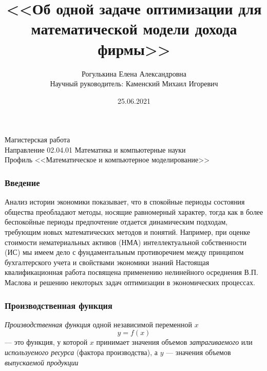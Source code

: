 \documentclass[10pt, pdf, hyperref={unicode}]{beamer}
\title{<<Об одной задаче оптимизации для математической модели дохода фирмы>>}
\date{25.06.2021}
\author{Рогулькина Елена Александровна\\
    \vspace{0.7cm}
    Научный руководитель: Каменский Михаил Игоревич\\
    \vspace{0.7cm}
}
\begin{document}
    \begin{frame} %
        \titlepage
        \begin{center}
            Магистерская работа\\
            Направление 02.04.01 Математика и компьютерные науки\\
            Профиль <<Математическое и компьютерное моделирование>>\\
        \end{center}
    \end{frame}


    \begin{frame}
        \frametitle{Введение}
        \begin{center}
            \begin{minipage}[h]{0.97\linewidth}
                Анализ истории экономики показывает, что в спокойные периоды состояния общества преобладают методы,
                носящие равномерный характер, тогда как в более беспокойные периоды предпочтение отдается динамическим подходам,
                требующим новых математических методов и понятий.
                \newline
                Например, при оценке стоимости нематериальных активов (НМА) интеллектуальной собственности (ИС) мы имеем дело с фундаментальным
                противоречием между принципом бухгалтерского учета и свойствами экономики знаний
                \newline\newline
                Настоящая квалификационная работа посвящена применению нелинейного осреднения
                В.П. Маслова и решению некоторых задач оптимизации в экономических процессах.
            \end{minipage}
        \end{center}
    \end{frame}

    \begin{frame}
        \frametitle{Производственная функция}
        \begin{center}
            \begin{minipage}[h]{0.97\linewidth}
                {\it Производственная функция} одной независимой переменной $x$
                \begin{equation}\label{f11}
                y=f(x)
                \end{equation}
                --- это функция, у которой $x$ принимает значения
                объемов {\it затрагиваемого} или {\it используемого ресурса}
                (фактора производства), а $y$ --- значения объемов {\it выпускаемой
                продукции}
            \end{minipage}
        \end{center}
    \end{frame}
\end{document}
